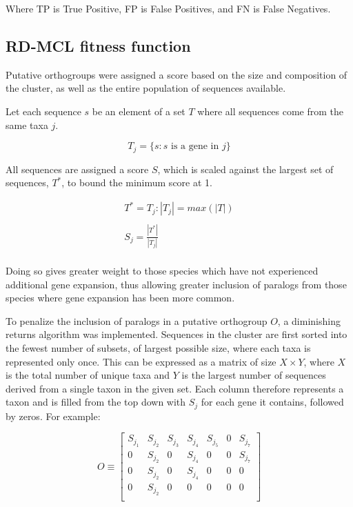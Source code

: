\documentclass[twocolumn]{bmcart}%
\begin{document}
Where TP is True Positive, FP is False Positives, and FN is False Negatives.

\subsection{RD-MCL fitness function}\label{subsec:rd-mclFitnessFunction}
Putative orthogroups were assigned a score based on the size and composition of the cluster, as well as the entire population of sequences available.

Let each sequence $s$ be an element of a set $T$ where all sequences come from the same taxa $j$.

\[
T_j = \{s:s \text{ is a gene in } j\}
\]

All sequences are assigned a score $S$, which is scaled against the largest set of sequences, $T^*$, to bound the minimum score at 1.

\begin{gather*}
    T^* = T_j:|T_j| = max(|T|)\\
    \\
    S_j = \frac{|T^*|}{|T_j|}\\
\end{gather*}

Doing so gives greater weight to those species which have not experienced additional gene expansion, thus allowing greater inclusion of paralogs from those species where gene expansion has been more common.

To penalize the inclusion of paralogs in a putative orthogroup $O$, a diminishing returns algorithm was implemented.
Sequences in the cluster are first sorted into the fewest number of subsets, of largest possible size, where each taxa is represented only once.
This can be expressed as a matrix of size $X \times Y$, where $X$ is the total number of unique taxa and $Y$ is the largest number of sequences derived from a single taxon in the given set.
Each column therefore represents a taxon and is filled from the top down with $S_j$ for each gene it contains, followed by zeros.
For example:


\[
O \equiv
\begin{bmatrix}
    S_{j_1} & S_{j_2} & S_{j_3} & S_{j_4} & S_{j_5} & 0 & S_{j_7}\\
    0 & S_{j_2} & 0 & S_{j_4} & 0 & 0 & S_{j_7} \\
    0 & S_{j_2} & 0 & S_{j_4} & 0 & 0 & 0 \\
    0 & S_{j_2} & 0 & 0 & 0 & 0 & 0 \\
\end{bmatrix}
\]
\end{document}

